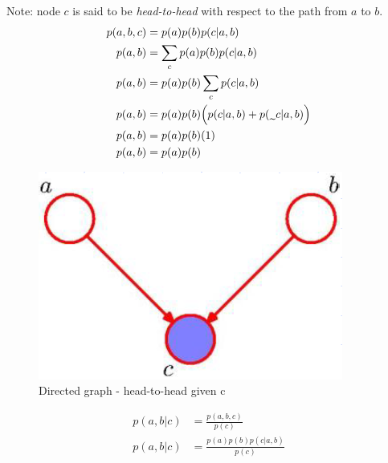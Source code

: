 Note: node $c$ is said to be \textit{head-to-head} with respect to the path from $a$ to $b$.
\begin{align*}
    p(a,b,c) & = p(a)p(b)p(c|a,b) \\
    p(a,b) & = \sum_c p(a)p(b)p(c|a,b) \\
    p(a,b) & = p(a)p(b) \sum_c p(c|a,b) \\
    p(a,b) & = p(a)p(b) \Big(p(c|a,b) + p(\midtilde c|a,b)\Big)  \\ 
    p(a,b) & = p(a)p(b) (1)  \\  
    p(a,b) & = p(a)p(b) \\       
\end{align*}
\begin{figure}[H]
 \centering 
\includegraphics[scale=0.42]{images/head-to-head-given-c.png} 
 \caption{Directed graph - head-to-head given c}
 \label{fig:head-to-head-given-c}
\end{figure}
\begin{align*}
    p(a,b|c) & = \frac{p(a,b,c)}{p(c)} \\
    p(a,b|c) & = \frac{p(a)p(b)p(c|a,b)}{p(c)} \\
\end{align*}


